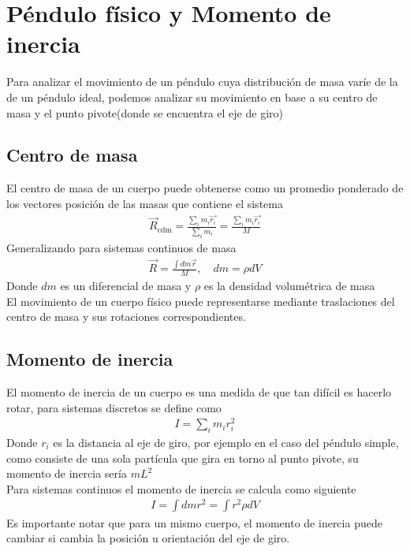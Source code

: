 \documentclass[12pt]{article}
\begin{document}
\section{Péndulo físico y  Momento de inercia}

Para analizar el movimiento de un péndulo cuya distribución de masa varíe de la de un péndulo ideal, podemos analizar su movimiento en base a su centro de masa y el punto pivote(donde se encuentra el eje de giro) \\
\subsection{Centro de masa}


El centro de masa de un cuerpo puede obtenerse como un promedio ponderado de los vectores posición de las masas que contiene el sistema
\begin{align}
    \vec{R}_\text{cdm} = \frac{\sum_i m_i \vec{r_i}}{\sum_i m_i} = \frac{\sum_i m_i \vec{r_i}}{ M} \label{eq: centro de masa}
\end{align} 
Generalizando para sistemas continuos de masa 
\begin{align*}
    \vec{R} = \frac{\int dm \vec{r}}{M}, \quad dm = \rho dV
\end{align*}
Donde \(dm \) es un diferencial de masa y \(\rho \) es la densidad volumétrica de masa \\

El movimiento de un cuerpo físico puede representarse mediante traslaciones del centro de masa y sus rotaciones correspondientes.
\subsection{Momento de inercia} 
El momento de inercia de un cuerpo es una medida de que tan difícil es hacerlo rotar, para sistemas discretos se define como 
\begin{align}
    I = \sum_i m_i r_i^{2} \label{eq: momento de inercia}
\end{align}
Donde \(r_i\) es la distancia al eje de giro, por ejemplo en el caso del péndulo simple, como consiste de una sola partícula que gira en torno al punto pivote, su momento de inercia sería \(mL^{2}\)\\

Para sistemas continuos el momento de inercia se calcula como siguiente
\begin{align*}
    I = \int dm r^{2} = \int r^{2} \rho dV
\end{align*}
Es importante notar que para un mismo cuerpo, el momento de inercia puede cambiar si cambia la posición u orientación del eje de giro.
\end{document}
